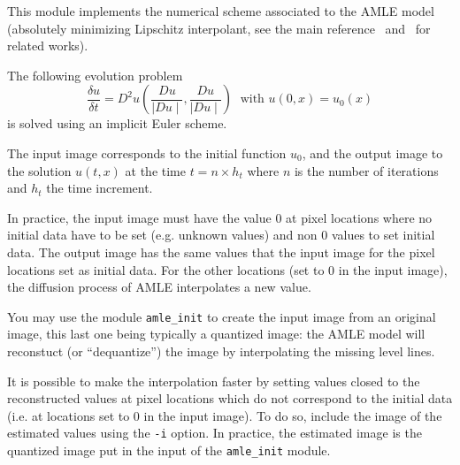 This module implements the numerical scheme associated to the
AMLE model (absolutely minimizing Lipschitz 
interpolant, see the main reference~\cite{caselles.morel.ea:axiomatic} 
and~\cite{aronsson:extension}\cite{cao:absolutely}\cite{froment:functional} for
related works).

The following evolution problem
\[
\frac{\delta u}{\delta t} = D^2 u \left( \frac{Du}{\mid Du \mid }, \frac{Du}{\mid Du \mid } \right) \; \mbox{ with } u(0,x)=u_0(x)
\]
is solved using an implicit Euler scheme.

The input image corresponds to the initial function $u_0$, and the output
image to the solution $u(t,x)$ at the time $t = n \times h_t$ where
$n$ is the number of iterations and $h_t$ the time increment.

In practice, the input image must have the value $0$ at pixel locations where
no initial data have to be set (e.g. unknown values) and non $0$ values
to set initial data. 
The output image has the same values that the input image for the
pixel locations set as initial data. For the other locations (set to $0$ in
the input image), the diffusion process of AMLE interpolates a new value.

You may use the module \verb+amle_init+ to create the input image
from an original image, this last one being typically a quantized image:
the AMLE model will reconstuct (or ``dequantize'') the image by
interpolating the missing level lines.

It is possible to make the interpolation faster by setting values closed
to the reconstructed values at pixel locations which do not correspond
to the initial data (i.e. at locations set to $0$ in the input image).
To do so, include the image of the estimated values using the \verb+-i+
option.
In practice, the estimated image is the quantized image put in the input
of the \verb+amle_init+ module.


